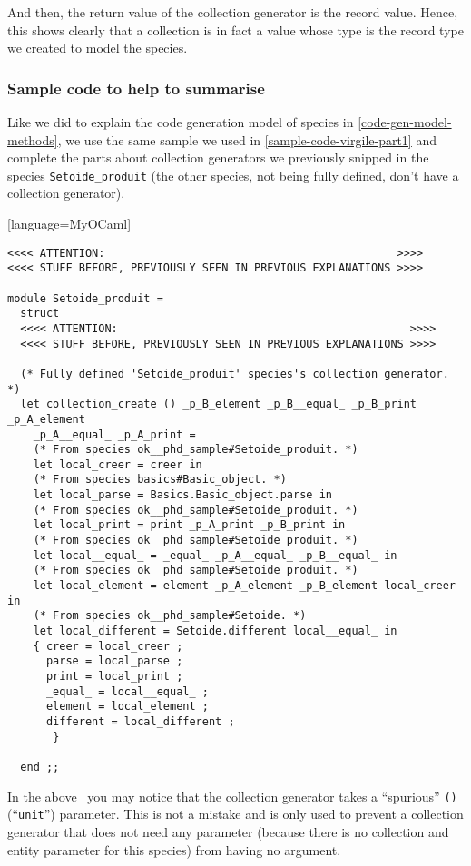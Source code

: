 And then, the return value of the collection generator is the record
value. Hence, this shows clearly that a collection is in fact a value
whose type is the record type we created to model the species.


\subsubsection{Sample code to help to summarise}
Like we did to explain the code generation model of species in
\ref{code-gen-model-methods}, we use the same sample we used in
\ref{sample-code-virgile-part1} and complete the parts about
collection generators we previously snipped in the species
{\tt Setoide\_produit} (the other species, not being fully defined,
don't have a collection generator).
{\footnotesize[language=MyOCaml]
\begin{lstlisting}
<<<< ATTENTION:                                             >>>>
<<<< STUFF BEFORE, PREVIOUSLY SEEN IN PREVIOUS EXPLANATIONS >>>>

module Setoide_produit =
  struct
  <<<< ATTENTION:                                             >>>>
  <<<< STUFF BEFORE, PREVIOUSLY SEEN IN PREVIOUS EXPLANATIONS >>>>

  (* Fully defined 'Setoide_produit' species's collection generator. *)
  let collection_create () _p_B_element _p_B__equal_ _p_B_print _p_A_element
    _p_A__equal_ _p_A_print =
    (* From species ok__phd_sample#Setoide_produit. *)
    let local_creer = creer in
    (* From species basics#Basic_object. *)
    let local_parse = Basics.Basic_object.parse in
    (* From species ok__phd_sample#Setoide_produit. *)
    let local_print = print _p_A_print _p_B_print in
    (* From species ok__phd_sample#Setoide_produit. *)
    let local__equal_ = _equal_ _p_A__equal_ _p_B__equal_ in
    (* From species ok__phd_sample#Setoide_produit. *)
    let local_element = element _p_A_element _p_B_element local_creer in
    (* From species ok__phd_sample#Setoide. *)
    let local_different = Setoide.different local__equal_ in
    { creer = local_creer ;
      parse = local_parse ;
      print = local_print ;
      _equal_ = local__equal_ ;
      element = local_element ;
      different = local_different ;
       }
    
  end ;;
\end{lstlisting}
}

\label{point-the-extra-unit-parameter-need}
In the above \ocaml\ you may notice that the collection generator
takes a ``spurious'' {\tt ()} (``{\tt unit}'') parameter. This is not
a mistake and is only used to prevent a collection generator that does
not need any parameter (because there is no collection and entity
parameter for this species) from having no argument.

